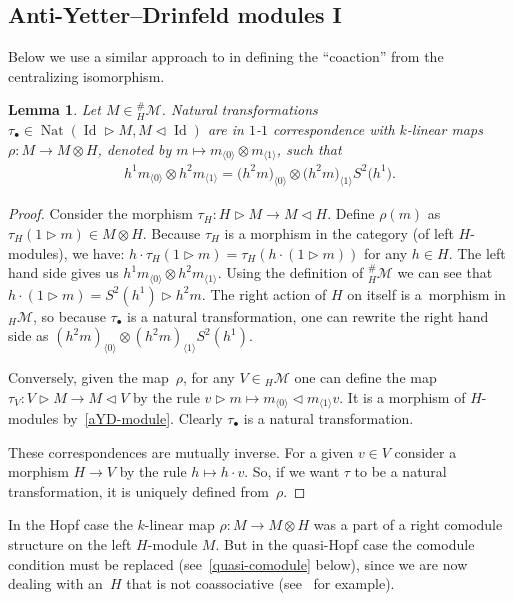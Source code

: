 \documentclass[pdftex]{sigma}
\newcommand{\hmod}{{_H\mathcal{M}}}
\newcommand{\hhash}{{^{\#}_H \mathcal{M}}}
\newcommand{\la}{\triangleright}
\newcommand{\ra}{\triangleleft}
\numberwithin{equation}{section}
\newtheorem{Lemma}[Theorem]{Lemma}
 { \theoremstyle{definition}
\newtheorem{Definition}[Theorem]{Definition}
\newtheorem{Remark}[Theorem]{Remark} }
\begin{document}
\subsection{Anti-Yetter--Drinfeld modules I} Below we use a similar approach to \cite{majid} in defining the ``coaction'' from the centralizing isomorphism.

\begin{Lemma}\label{aYD-module lemma}Let $M \in \hhash$. Natural transformations $\tau_{\bullet} \in \operatorname{Nat} (\operatorname{Id} \la M, M \ra \operatorname{Id})$ are in $1$-$1$ correspondence with $k$-linear maps $\rho\colon M \rightarrow M \otimes H $, denoted by $m \mapsto m_{\langle0\rangle} \otimes m_{\langle1\rangle}$, such that
\begin{gather}\label{aYD-module}
h^1 m_{\langle 0\rangle} \otimes h^2 m_{\langle 1\rangle} = \big(h^2 m\big)_{\langle0\rangle} \otimes \big(h^2 m\big)_{\langle 1\rangle} S^2\big(h^1\big).
\end{gather}
\end{Lemma}

\begin{proof}Consider the morphism $\tau_H \colon H \la M \rightarrow M \ra H $. Define $\rho (m)$ as $\tau_H (1\la m) \in M\otimes H$. Because $\tau_H $ is a morphism in the category (of left $H$-modules), we have: $h \cdot \tau_H(1\la m) = \tau_H (h\cdot (1\la m)) $ for any $h \in H$. The left hand side gives us $h^1 m_{\langle 0\rangle} \otimes h^2 m_{\langle 1\rangle} $. Using the definition of $\hhash$ we can see that $h\cdot (1\la m) = S^2(h^1) \la h^2 m $. The right action of $H$ on itself is a~morphism in $\hmod$, so because $\tau_\bullet$ is a natural transformation, one can rewrite the right hand side as $(h^2 m)_{\langle0\rangle} \otimes (h^2 m)_{\langle 1\rangle} S^2(h^1)$.

Conversely, given the map~$\rho$, for any $V \in \hmod $ one can define the map $\tau_V\colon V \la M \rightarrow M \ra V $ by the rule $v \la m \mapsto m_{\langle0\rangle} \ra m_{\langle1\rangle} v$. It is a morphism of $H$-modules by~\eqref{aYD-module}. Clearly $\tau_\bullet$ is a natural transformation.

These correspondences are mutually inverse. For a given $v \in V$ consider a morphism $H \rightarrow V$ by the rule $h \mapsto h \cdot v$. So, if we want $\tau$ to be a natural transformation, it is uniquely defined from~$\rho$.
\end{proof}

In the Hopf case the $k$-linear map $\rho\colon M \rightarrow M\otimes H$ was a part of a right comodule structure on the left $H$-module $M$. But in the quasi-Hopf case the comodule condition must be replaced (see~\eqref{quasi-comodule} below), since we are now dealing with an~$H$ that is not coassociative (see~\cite{pv} for example).
\end{document}
